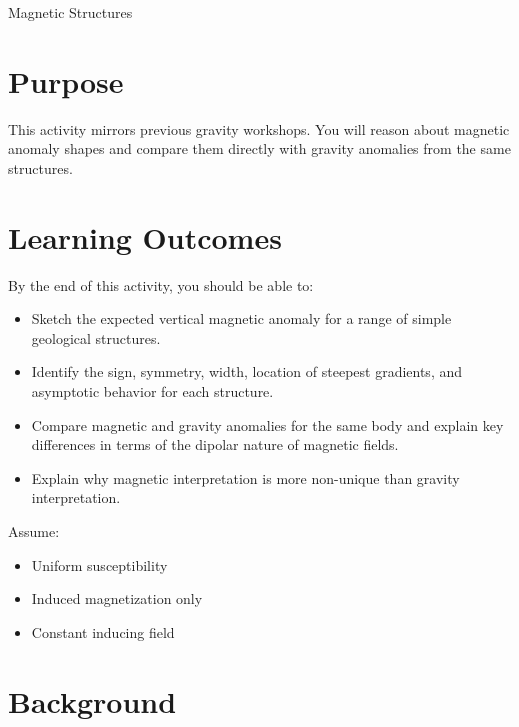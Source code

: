 \newcommand\bax{
  \begin{center}
    \begin{tikzpicture}[scale=0.85]
      \draw[->] (-5,0) -- (5,0) node[above right] {$x$};
      \draw[->,red] (-5,-1.1) -- (-5,1.1) node[left] {$B_z$};
      \draw[thin] (-5,0) -- (5,0);
      \draw[->,blue] (5,-1.1) -- (5,1.1) node[right] {$g_z$};
    \end{tikzpicture}
  \end{center}
}

\begin{activity}{Magnetic Structures}

\section*{Purpose}

This activity mirrors previous gravity workshops. You will reason about magnetic anomaly shapes and compare them directly with gravity anomalies from the same structures.

\section*{Learning Outcomes}

By the end of this activity, you should be able to:
\begin{itemize}
  \item Sketch the expected vertical magnetic anomaly for a range of simple geological structures.
  \item Identify the sign, symmetry, width, location of steepest gradients, and asymptotic behavior for each structure.
  \item Compare magnetic and gravity anomalies for the same body and explain key differences in terms of the dipolar nature of magnetic fields.
  \item Explain why magnetic interpretation is more non-unique than gravity interpretation.
\end{itemize}

Assume:
\begin{itemize}
  \item Uniform susceptibility
  \item Induced magnetization only
  \item Constant inducing field
\end{itemize}

\section*{Background}


\end{activity}
